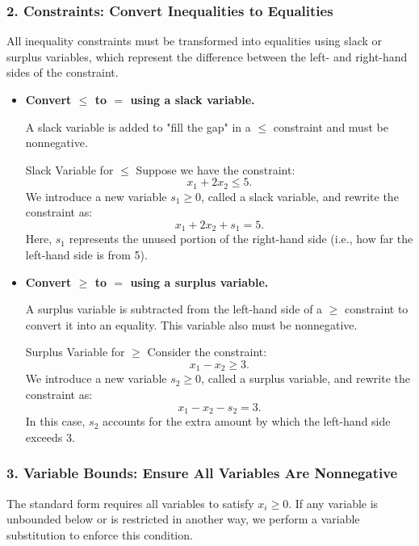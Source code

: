 \subsubsection*{2. Constraints: Convert Inequalities to Equalities}

All inequality constraints must be transformed into equalities using slack or surplus variables, which represent the difference between the left- and right-hand sides of the constraint.

\begin{itemize}
    \item[(a)] \textbf{Convert \( \leq \) to \( = \) using a slack variable.}

    A slack variable is added to "fill the gap" in a \( \leq \) constraint and must be nonnegative.

    \begin{example}{Slack Variable for \(\leq\)}{}
    Suppose we have the constraint:
    \[
    x_1 + 2x_2 \leq 5.
    \]
    We introduce a new variable \( s_1 \geq 0 \), called a slack variable, and rewrite the constraint as:
    \[
    x_1 + 2x_2 + s_1 = 5.
    \]
    Here, \( s_1 \) represents the unused portion of the right-hand side (i.e., how far the left-hand side is from 5).
    \end{example}

    \item[(b)] \textbf{Convert \( \geq \) to \( = \) using a surplus variable.}

    A surplus variable is subtracted from the left-hand side of a \( \geq \) constraint to convert it into an equality. This variable also must be nonnegative.

    \begin{example}{Surplus Variable for \(\geq\)}{}
    Consider the constraint:
    \[
    x_1 - x_2 \geq 3.
    \]
    We introduce a new variable \( s_2 \geq 0 \), called a surplus variable, and rewrite the constraint as:
    \[
    x_1 - x_2 - s_2 = 3.
    \]
    In this case, \( s_2 \) accounts for the extra amount by which the left-hand side exceeds 3.
    \end{example}
\end{itemize}

\subsubsection*{3. Variable Bounds: Ensure All Variables Are Nonnegative}

The standard form requires all variables to satisfy \( x_i \geq 0 \). If any variable is unbounded below or is restricted in another way, we perform a variable substitution to enforce this condition.

